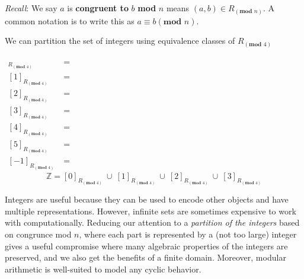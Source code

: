 \documentclass[12pt, oneside]{article}
\begin{document}
{\it Recall}: We say $a$ is {\bf congruent to} $b$ \textbf{mod} $n$ 
means $(a, b) \in R_{(\textbf{mod } n)}$. 
A common notation is to write this as $a \equiv b (\textbf{mod } n)$.

We can partition the set of integers using equivalence classes of  $R_{(\textbf{mod } 4)}$

\begin{align*}
    [0]_{R_{(\textbf{mod } 4)}} &= \phantom{ \{ x \in \mathbb{Z} \mid x \equiv 0 ((\textbf{mod } 4)) \} 
    = \{ x \in \mathbb{Z} \mid x \textbf{ mod } 4 = 0 \textbf{ mod } 4 = 0 \} = \{ 4c \mid c \in \mathbb{Z}\} }\\
    [1]_{R_{(\textbf{mod } 4)}} &= \phantom{ \{ x \in \mathbb{Z} \mid x \equiv 1 ((\textbf{mod } 4)) \} 
    = \{ x \in \mathbb{Z} \mid x \textbf{ mod } 4 = 1 \textbf{ mod } 4 = 1 \} = \{ 4c+1 \mid c \in \mathbb{Z}\} }\\
    [2]_{R_{(\textbf{mod } 4)}} &= \phantom{ \{ x \in \mathbb{Z} \mid x \equiv 2 ((\textbf{mod } 4)) \} 
    = \{ x \in \mathbb{Z} \mid x \textbf{ mod } 4 = 2 \textbf{ mod } 4 = 0 \} = \{ 4c+2 \mid c \in \mathbb{Z}\} }\\
    [3]_{R_{(\textbf{mod } 4)}} &= \phantom{ \{ x \in \mathbb{Z} \mid x \equiv 3 ((\textbf{mod } 4)) \} 
    = \{ x \in \mathbb{Z} \mid x \textbf{ mod } 4 = 3 \textbf{ mod } 4 = 3 \} = \{ 4c+3 \mid c \in \mathbb{Z}\} }\\
    [4]_{R_{(\textbf{mod } 4)}} &= \phantom{ \{ x \in \mathbb{Z} \mid x \equiv 4 ((\textbf{mod } 4)) \} 
    = \{ x \in \mathbb{Z} \mid x \textbf{ mod } 4 = 4 \textbf{ mod } 4 = 0 \} = \{ 4c \mid c \in \mathbb{Z}\} }\\
    [5]_{R_{(\textbf{mod } 4)}} &= \phantom{ \{ x \in \mathbb{Z} \mid x \equiv 5 ((\textbf{mod } 4)) \} 
    = \{ x \in \mathbb{Z} \mid x \textbf{ mod } 4 = 5 \textbf{ mod } 4 = 1 \} = \{ 4c+1 \mid c \in \mathbb{Z}\} }\\
    [-1]_{R_{(\textbf{mod } 4)}} &= \phantom{ \{ x \in \mathbb{Z} \mid x \equiv -1 ((\textbf{mod } 4)) \} 
    = \{ x \in \mathbb{Z} \mid x \textbf{ mod } 4 = -1 \textbf{ mod } 4 = 3 \} = \{ 4c+3 \mid c \in \mathbb{Z}\} }
\end{align*}
\[
\mathbb{Z} =  [0]_{R_{(\textbf{mod } 4)}}~ \cup ~[1]_{R_{(\textbf{mod } 4)}} ~\cup~[2]_{R_{(\textbf{mod } 4)}}~\cup~
[3]_{R_{(\textbf{mod } 4)}}
\]





 

Integers are useful because they can be used to encode other objects
and have multiple representations. However, infinite sets are sometimes
expensive to work with computationally. Reducing our attention to 
a {\it partition of the integers} based on congrunce mod $n$, where
each part is represented by a (not too large) integer gives a useful 
compromise where many algebraic properties of the integers are preserved, 
and we also get the benefits of a finite domain. Moreover, modular arithmetic
is well-suited to model any cyclic behavior. 
\end{document}
